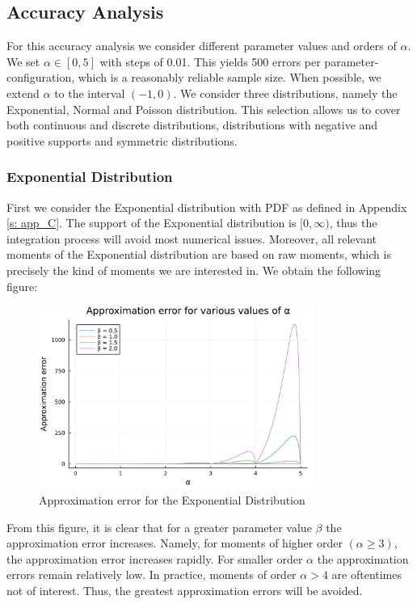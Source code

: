 \subsection{Accuracy Analysis}
For this accuracy analysis we consider different parameter values and orders of \(\alpha\). We set \(\alpha \in [0, 5]\) with steps of 0.01. This yields 500 errors per parameter-configuration, which is a reasonably reliable sample size. When possible, we extend \(\alpha\) to the interval \((-1, 0)\). We consider three distributions, namely the Exponential, Normal and Poisson distribution. This selection allows us to cover both continuous and discrete distributions, distributions with negative and positive supports and symmetric distributions. 
\subsubsection{Exponential Distribution}
First we consider the Exponential distribution with PDF as defined in Appendix \ref{s: app_C}.
The support of the Exponential distribution is \([0, \infty)\), thus the integration process will avoid most numerical issues. Moreover, all relevant moments of the Exponential distribution are based on raw moments, which is precisely the kind of moments we are interested in.
\newline
We obtain the following figure:
\begin{figure}[H]
    \centering
    \includegraphics[width=0.8\textwidth]{figures/error_plot_exp.pdf}
    \caption{Approximation error for the Exponential Distribution}
    \label{fig:error_plot_exp}
\end{figure}
From this figure, it is clear that for a greater parameter value \(\beta\) the approximation error increases. Namely, for moments of higher order \((\alpha \geq 3)\), the approximation error increases rapidly. For smaller order \(\alpha\) the approximation errors remain relatively low. In practice, moments of order \(\alpha > 4\) are oftentimes not of interest. Thus, the greatest approximation errors will be avoided.

